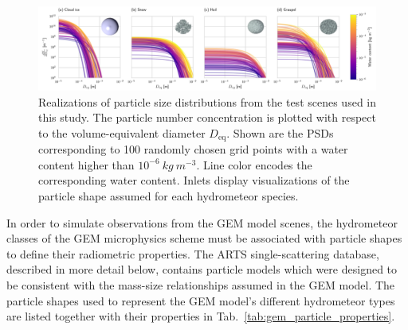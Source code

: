 \documentclass[journal abbreviation, manuscript]{copernicus}
\begin{document}
\begin{figure}[h!]
\centering \includegraphics[width = \textwidth]{../plots/gem_psds.png}
\caption{Realizations of particle size distributions from the test scenes used
  in this study. The particle number concentration is plotted with respect to
  the volume-equivalent diameter $D_\text{eq}$. Shown are the PSDs corresponding
  to 100 randomly chosen grid points with a water content higher than
  $10^{-6}\ \unit{kg\ m^{-3}}$. Line color encodes the corresponding water
  content. Inlets display visualizations of the particle shape assumed for each
  hydrometeor species.}
\label{fig:gem_psds}
\end{figure}

In order to simulate observations from the GEM model scenes, the hydrometeor
classes of the GEM microphysics scheme must be associated with particle shapes
to define their radiometric properties. The ARTS single-scattering database,
described in more detail below, contains particle models which were designed to
be consistent with the mass-size relationships assumed in the GEM model. The
particle shapes used to represent the GEM model's different hydrometeor types
are listed together with their properties in
Tab.~\ref{tab:gem_particle_properties}.
\end{document}
